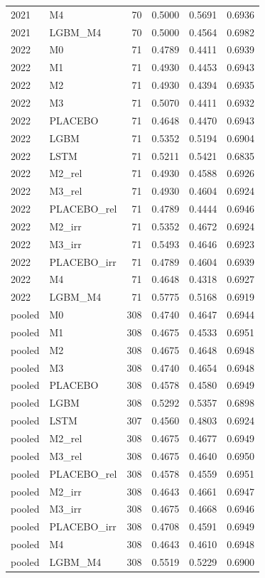 \begin{tabular}{llrrrr}
2021 & M4 & 70 & 0.5000 & 0.5691 & 0.6936 \\
2021 & LGBM\_M4 & 70 & 0.5000 & 0.4564 & 0.6982 \\
2022 & M0 & 71 & 0.4789 & 0.4411 & 0.6939 \\
2022 & M1 & 71 & 0.4930 & 0.4453 & 0.6943 \\
2022 & M2 & 71 & 0.4930 & 0.4394 & 0.6935 \\
2022 & M3 & 71 & 0.5070 & 0.4411 & 0.6932 \\
2022 & PLACEBO & 71 & 0.4648 & 0.4470 & 0.6943 \\
2022 & LGBM & 71 & 0.5352 & 0.5194 & 0.6904 \\
2022 & LSTM & 71 & 0.5211 & 0.5421 & 0.6835 \\
2022 & M2\_rel & 71 & 0.4930 & 0.4588 & 0.6926 \\
2022 & M3\_rel & 71 & 0.4930 & 0.4604 & 0.6924 \\
2022 & PLACEBO\_rel & 71 & 0.4789 & 0.4444 & 0.6946 \\
2022 & M2\_irr & 71 & 0.5352 & 0.4672 & 0.6924 \\
2022 & M3\_irr & 71 & 0.5493 & 0.4646 & 0.6923 \\
2022 & PLACEBO\_irr & 71 & 0.4789 & 0.4604 & 0.6939 \\
2022 & M4 & 71 & 0.4648 & 0.4318 & 0.6927 \\
2022 & LGBM\_M4 & 71 & 0.5775 & 0.5168 & 0.6919 \\
pooled & M0 & 308 & 0.4740 & 0.4647 & 0.6944 \\
pooled & M1 & 308 & 0.4675 & 0.4533 & 0.6951 \\
pooled & M2 & 308 & 0.4675 & 0.4648 & 0.6948 \\
pooled & M3 & 308 & 0.4740 & 0.4654 & 0.6948 \\
pooled & PLACEBO & 308 & 0.4578 & 0.4580 & 0.6949 \\
pooled & LGBM & 308 & 0.5292 & 0.5357 & 0.6898 \\
pooled & LSTM & 307 & 0.4560 & 0.4803 & 0.6924 \\
pooled & M2\_rel & 308 & 0.4675 & 0.4677 & 0.6949 \\
pooled & M3\_rel & 308 & 0.4675 & 0.4640 & 0.6950 \\
pooled & PLACEBO\_rel & 308 & 0.4578 & 0.4559 & 0.6951 \\
pooled & M2\_irr & 308 & 0.4643 & 0.4661 & 0.6947 \\
pooled & M3\_irr & 308 & 0.4675 & 0.4668 & 0.6946 \\
pooled & PLACEBO\_irr & 308 & 0.4708 & 0.4591 & 0.6949 \\
pooled & M4 & 308 & 0.4643 & 0.4610 & 0.6948 \\
pooled & LGBM\_M4 & 308 & 0.5519 & 0.5229 & 0.6900 \\
\bottomrule
\end{tabular}
